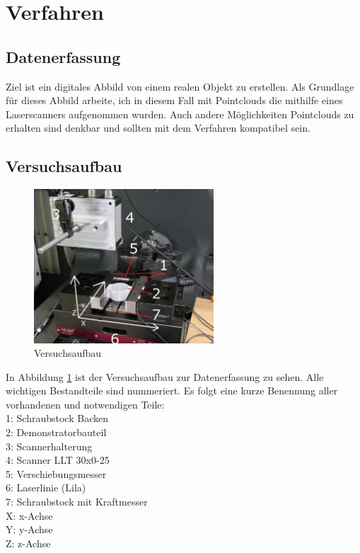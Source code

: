 \documentclass[../main.tex]{subfiles}
\begin{document}
\section{Verfahren}

\subsection{Datenerfassung}
Ziel ist ein digitales Abbild von einem realen Objekt zu erstellen.
Als Grundlage für dieses Abbild arbeite, ich in diesem Fall mit Pointclouds 
die mithilfe eines Laserscanners aufgenommen wurden. Auch andere Möglichkeiten
Pointclouds zu erhalten sind denkbar und sollten mit dem Verfahren 
kompatibel sein.

\subsection{Versuchsaufbau}

\begin{figure}
    \includegraphics[width=0.6\textwidth]{images/versuchsaufbau_foto.png.JPG}
    \caption{Versuchsaufbau}
    \label{fig:versuchsaufbau}
\end{figure}

In Abbildung \ref{fig:versuchsaufbau} ist der Versuchsaufbau zur Datenerfassung 
zu sehen. Alle wichtigen Bestandteile sind nummeriert. Es folgt eine kurze Benennung
aller vorhandenen und notwendigen Teile:\\
1: Schraubstock Backen\\
2: Demonstratorbauteil\\
3: Scannerhalterung\\
4: Scanner LLT 30x0-25\\
5: Verschiebungsmesser\\
6: Laserlinie (Lila)\\
7: Schraubstock mit Kraftmesser\\
X: x-Achse\\
Y: y-Achse\\
Z: z-Achse\\
\end{document}
